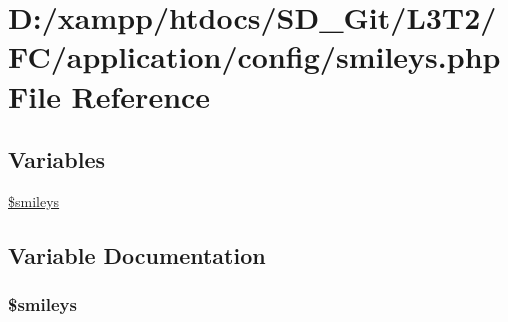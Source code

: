\hypertarget{smileys_8php}{}\section{D\+:/xampp/htdocs/\+S\+D\+\_\+\+Git/\+L3\+T2/\+F\+C/application/config/smileys.php File Reference}
\label{smileys_8php}
\subsection*{Variables}
\begin{DoxyCompactItemize}
\item 
\hyperlink{smileys_8php_a3f21d1c0fb54cb2010e7c7004f29f74c}{\$smileys}
\end{DoxyCompactItemize}


\subsection{Variable Documentation}
\hypertarget{smileys_8php_a3f21d1c0fb54cb2010e7c7004f29f74c}{}
\subsubsection[{\$smileys}]{\setlength{\rightskip}{0pt plus 5cm}\$smileys}\label{smileys_8php_a3f21d1c0fb54cb2010e7c7004f29f74c}
